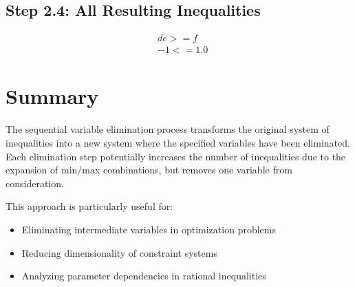\documentclass{article}
\begin{document}
\subsection{Step 2.4: All Resulting Inequalities}

\begin{align}
& d e >= f \\
& -1 <= 1.0
\end{align}


\section{Summary}

The sequential variable elimination process transforms the original system of inequalities 
into a new system where the specified variables have been eliminated. Each elimination 
step potentially increases the number of inequalities due to the expansion of min/max 
combinations, but removes one variable from consideration.

This approach is particularly useful for:
\begin{itemize}
\item Eliminating intermediate variables in optimization problems
\item Reducing dimensionality of constraint systems
\item Analyzing parameter dependencies in rational inequalities
\end{itemize}
\end{document}
